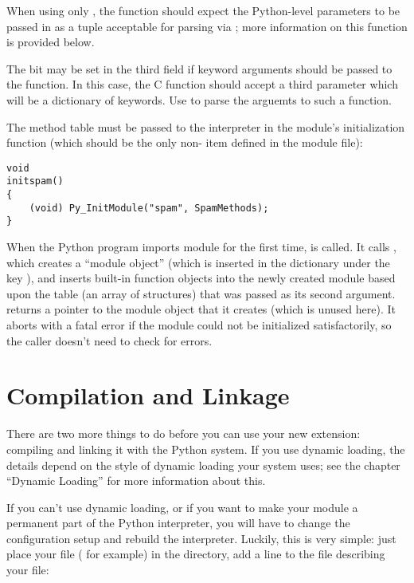\documentclass{manual}
\begin{document}
When using only , the function should expect
the Python-level parameters to be passed in as a tuple acceptable for
parsing via ; more information on this
function is provided below.

The  bit may be set in the third field if keyword
arguments should be passed to the function.  In this case, the C
function should accept a third  parameter which will
be a dictionary of keywords.  Use 
to parse the arguemts to such a function.

The method table must be passed to the interpreter in the module's
initialization function (which should be the only non-
item defined in the module file):

\begin{verbatim}
void
initspam()
{
    (void) Py_InitModule("spam", SpamMethods);
}
\end{verbatim}

When the Python program imports module  for the first
time,  is called.  It calls
, which creates a ``module object'' (which
is inserted in the dictionary  under the key
), and inserts built-in function objects into the newly
created module based upon the table (an array of 
structures) that was passed as its second argument.
 returns a pointer to the module object
that it creates (which is unused here).  It aborts with a fatal error
if the module could not be initialized satisfactorily, so the caller
doesn't need to check for errors.


\section{Compilation and Linkage
         \label{compilation}}

There are two more things to do before you can use your new extension:
compiling and linking it with the Python system.  If you use dynamic
loading, the details depend on the style of dynamic loading your
system uses; see the chapter ``Dynamic Loading'' for more information
about this.

If you can't use dynamic loading, or if you want to make your module a
permanent part of the Python interpreter, you will have to change the
configuration setup and rebuild the interpreter.  Luckily, this is
very simple: just place your file ( for example) in
the  directory, add a line to the file
 describing your file:
\end{document}
